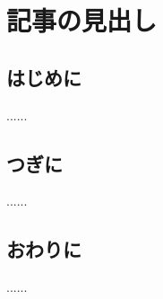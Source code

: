 \documentclass{word-lua}
\subtitle{ヘッダの見出し}
\author{ほげ}
\begin{document}
\chapter{記事の見出し}

\section{はじめに}
......
\section{つぎに}
......
\section{おわりに}
......
\end{document}
